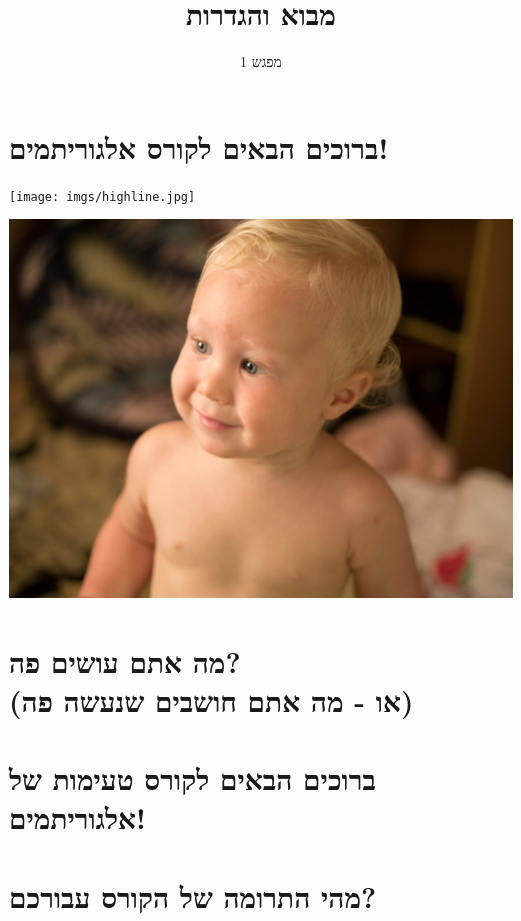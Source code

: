 \documentclass[luatex]{beamer}
\begin{document}
	\title{מבוא והגדרות}
	\subtitle{מפגש 1}
	\date{}
	
 \section{ברוכים הבאים לקורס אלגוריתמים!}

\begin{frame}
\texttt{[image: imgs/highline.jpg]}
\end{frame}
\begin{frame}
\includegraphics[width=\linewidth]{imgs/nael.jpg}
\end{frame}
\section{מה אתם עושים פה? \\ \large{(או - מה אתם חושבים שנעשה פה)}}
\section{ברוכים הבאים לקורס  טעימות של אלגוריתמים!}
\section{מהי התרומה של הקורס עבורכם?}
% 
\end{document}
